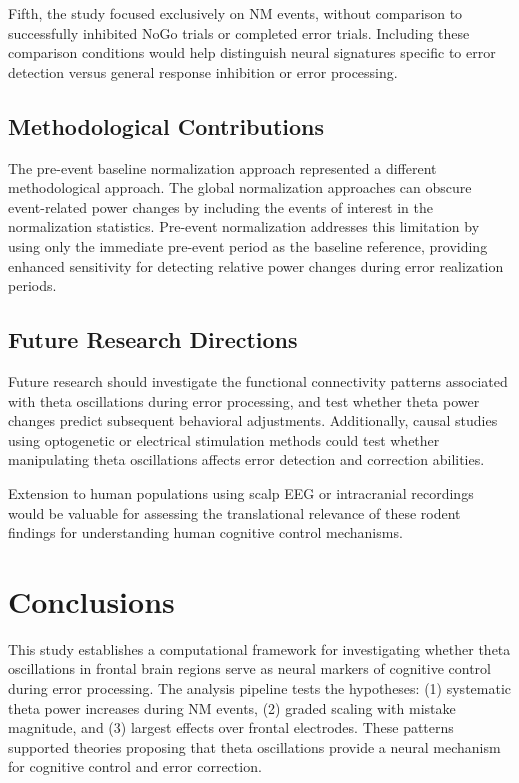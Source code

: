 \documentclass[11pt]{article}
\begin{document}
Fifth, the study focused exclusively on NM events, without comparison to successfully inhibited NoGo trials or completed error trials. Including these comparison conditions would help distinguish neural signatures specific to error detection versus general response inhibition or error processing.

\subsection{Methodological Contributions}

The pre-event baseline normalization approach represented a different methodological approach. The global normalization approaches can obscure event-related power changes by including the events of interest in the normalization statistics. Pre-event normalization addresses this limitation by using only the immediate pre-event period as the baseline reference, providing enhanced sensitivity for detecting relative power changes during error realization periods.

\subsection{Future Research Directions}

Future research should investigate the functional connectivity patterns associated with theta oscillations during error processing, and test whether theta power changes predict subsequent behavioral adjustments. Additionally, causal studies using optogenetic or electrical stimulation methods could test whether manipulating theta oscillations affects error detection and correction abilities.

Extension to human populations using scalp EEG or intracranial recordings would be valuable for assessing the translational relevance of these rodent findings for understanding human cognitive control mechanisms.

\section{Conclusions}

This study establishes a computational framework for investigating whether theta oscillations in frontal brain regions serve as neural markers of cognitive control during error processing. The analysis pipeline tests the hypotheses: (1) systematic theta power increases during NM events, (2) graded scaling with mistake magnitude, and (3) largest effects over frontal electrodes. These patterns supported theories proposing that theta oscillations provide a neural mechanism for cognitive control and error correction.
\end{document}
